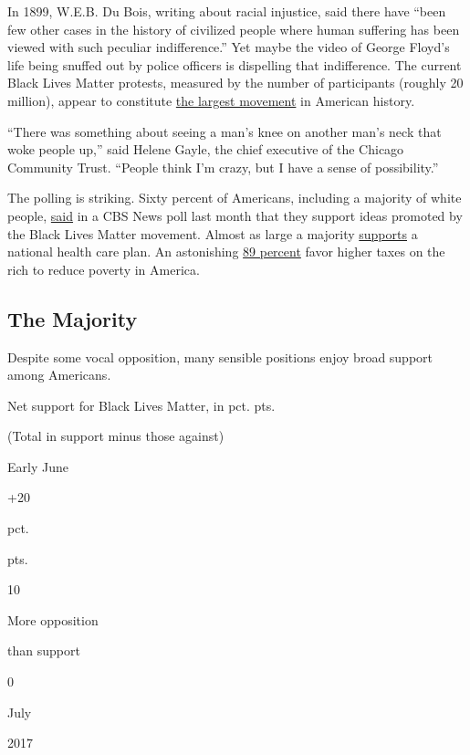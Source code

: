 In 1899, W.E.B. Du Bois, writing about racial injustice, said there have
``been few other cases in the history of civilized people where human
suffering has been viewed with such peculiar indifference.'' Yet maybe
the video of George Floyd's life being snuffed out by police officers is
dispelling that indifference. The current Black Lives Matter protests,
measured by the number of participants (roughly 20 million), appear to
constitute
\href{https://www.nytimes.com/interactive/2020/07/03/us/george-floyd-protests-crowd-size.html}{the
largest movement} in American history.

``There was something about seeing a man's knee on another man's neck
that woke people up,'' said Helene Gayle, the chief executive of the
Chicago Community Trust. ``People think I'm crazy, but I have a sense of
possibility.''

The polling is striking. Sixty percent of Americans, including a
majority of white people,
\href{https://www.cbsnews.com/news/black-lives-matter-police-reform-opinion-poll-28-06-2020/}{said}
in a CBS News poll last month that they support ideas promoted by the
Black Lives Matter movement. Almost as large a majority
\href{https://www.kff.org/slideshow/public-opinion-on-single-payer-national-health-plans-and-expanding-access-to-medicare-coverage/}{supports}
a national health care plan. An astonishing
\href{https://www.politico.com/f/?id=00000169-2b4f-d6dd-ad79-3fef4cf70002}{89
percent} favor higher taxes on the rich to reduce poverty in America.

\hypertarget{the-majority}{%
\subsection{The Majority}\label{the-majority}}

Despite some vocal opposition, many sensible positions enjoy broad
support among Americans.

Net support for Black Lives Matter, in pct. pts.

(Total in support minus those against)

Early June

+20

pct.

pts.

10

More opposition

than support

0

July

2017

